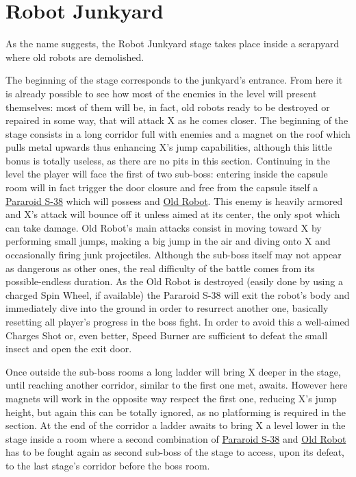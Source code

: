 \section{Robot Junkyard}
As the name suggests, the Robot Junkyard stage takes place inside a scrapyard where old robots are demolished.

The beginning of the stage corresponds to the junkyard's entrance. From here it is already possible to see how most of the enemies in the level will present themselves: most of them will be, in fact, old robots ready to be destroyed or repaired in some way, that will attack X as he comes closer. The beginning of the stage consists in a long corridor full with enemies and a magnet on the roof which pulls metal upwards thus enhancing X's jump capabilities, although this little bonus is totally useless, as there are no pits in this section. Continuing in the level the player will face the first of two sub-boss: entering inside the capsule room will in fact trigger the door closure and free from the capsule itself a \hyperlink{miniboss:Pararoid_S-38}{Pararoid S-38} which will possess and \hyperlink{miniboss:Old_robot}{Old Robot}. This enemy is heavily armored and X's attack will bounce off it unless aimed at its center, the only spot which can take damage. Old Robot's main attacks consist in moving toward X by performing small jumps, making a big jump in the air and diving onto X and occasionally firing junk projectiles. Although the sub-boss itself may not appear as dangerous as other ones, the real difficulty of the battle comes from its possible-endless duration. As the Old Robot is destroyed (easily done by using a charged Spin Wheel, if available) the Pararoid S-38 will exit the robot's body and immediately dive into the ground in order to resurrect another one, basically resetting all player's progress in the boss fight. In order to avoid this a well-aimed Charges Shot or, even better, Speed Burner are sufficient to defeat the small insect and open the exit door.

Once outside the sub-boss rooms a long ladder will bring X deeper in the stage, until reaching another corridor, similar to the first one met, awaits. However here magnets will work in the opposite way respect the first one, reducing X's jump height, but again this can be totally ignored, as no platforming is required in the section. At the end of the corridor a ladder awaits to bring X a level lower in the stage inside a room where a second combination of  \hyperlink{miniboss:Paraloid_S-38}{Pararoid S-38} and \hyperlink{miniboss:Old_robot}{Old Robot} has to be fought again as second sub-boss of the stage to access, upon its defeat, to the last stage's corridor before the boss room.

